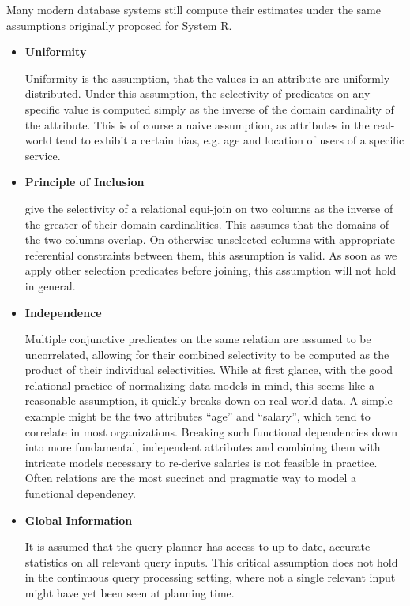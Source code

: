 \documentclass[../index.tex]{subfiles}
\begin{document}
Many modern database systems still compute their estimates under the
same assumptions originally proposed for System R.

\begin{itemize}
\item \textbf{Uniformity}

  Uniformity is the assumption, that the values in an attribute are
  uniformly distributed. Under this assumption, the selectivity of
  predicates on any specific value is computed simply as the inverse
  of the domain cardinality of the attribute. This is of course a
  naive assumption, as attributes in the real-world tend to exhibit a
  certain bias, e.g. age and location of users of a specific service.

\item \textbf{Principle of Inclusion}

  \cite{selinger1979access} give the selectivity of a relational
  equi-join on two columns as the inverse of the greater of their
  domain cardinalities. This assumes that the domains of the two
  columns overlap. On otherwise unselected columns with appropriate
  referential constraints between them, this assumption is valid. As
  soon as we apply other selection predicates before joining, this
  assumption will not hold in general.

\item \textbf{Independence}

  Multiple conjunctive predicates on the same relation are assumed to
  be uncorrelated, allowing for their combined selectivity to be
  computed as the product of their individual selectivities. While at
  first glance, with the good relational practice of normalizing data
  models in mind, this seems like a reasonable assumption, it quickly
  breaks down on real-world data. A simple example might be the two
  attributes ``age'' and ``salary'', which tend to correlate in most
  organizations. Breaking such functional dependencies down into more
  fundamental, independent attributes and combining them with
  intricate models necessary to re-derive salaries is not feasible in
  practice. Often relations are the most succinct and pragmatic way to
  model a functional dependency.

\item \textbf{Global Information}

  It is assumed that the query planner has access to up-to-date,
  accurate statistics on all relevant query inputs. This critical
  assumption does not hold in the continuous query processing setting,
  where not a single relevant input might have yet been seen at
  planning time.

\end{itemize}
\end{document}
